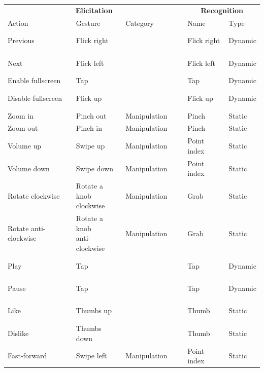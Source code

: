 \begin{minipage}{\textwidth}
\begin{minipage}[c]{0.70\textwidth}
{    \begin{tabular}{lll|ll}%
    	\toprule
    	\multicolumn{3}{c|}{\textbf{Elicitation}} & \multicolumn{2}{c}{\textbf{Recognition}}\\
    	Action & Gesture & Category & Name & Type \\
    	\midrule
        Previous & Flick right & \cellcolor{semaphoric} \textcolor{white}{Stroke semaphoric} & Flick right & Dynamic \\
        Next & Flick left & \cellcolor{semaphoric} \textcolor{white}{Stroke semaphoric} & Flick left & Dynamic \\
        Enable fullscreen & Tap & \cellcolor{pointing} \textcolor{white}{Pointing} & Tap & Dynamic \\
        Disable fullscreen & Flick up & \cellcolor{semaphoric} \textcolor{white}{Stroke semaphoric} & Flick up & Dynamic \\
        Zoom in & Pinch out & \cellcolor{manipulation} Manipulation & Pinch & Static \\
        Zoom out & Pinch in & \cellcolor{manipulation} Manipulation & Pinch & Static \\
        Volume up & Swipe up & \cellcolor{manipulation} Manipulation & Point index & Static \\
        Volume down & Swipe down & \cellcolor{manipulation} Manipulation & Point index & Static \\
        Rotate clockwise &\shortstack[l]{Rotate a knob\\clockwise} & \cellcolor{manipulation} Manipulation & Grab & Static \\
        Rotate anti-clockwise &\shortstack[l]{Rotate a knob\\anti-clockwise} & \cellcolor{manipulation} Manipulation & Grab & Static \\
        Play & Tap & \cellcolor{semaphoric} \textcolor{white}{Stroke semaphoric} & Tap & Dynamic \\
        Pause & Tap & \cellcolor{semaphoric} \textcolor{white}{Stroke semaphoric} & Tap & Dynamic \\
        Like & Thumbs up & \cellcolor{semaphoric} \textcolor{white}{Static semaphoric} & Thumb & Static \\
        Dislike & Thumbs down & \cellcolor{semaphoric} \textcolor{white}{Static semaphoric} & Thumb & Static \\
        Fast-forward & Swipe left & \cellcolor{manipulation} Manipulation & Point index & Static \\

\end{tabular}}
\end{minipage}
\end{minipage}
